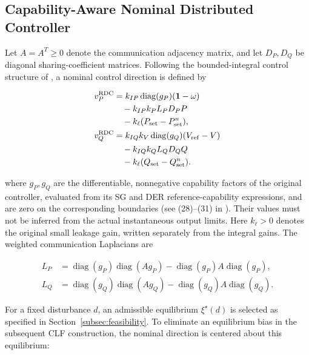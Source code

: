 \documentclass[11pt,twocolumn]{article}
\begin{document}
\subsection{Capability-Aware Nominal Distributed Controller}

\label{subsec:nominal}

Let $A=A^T\geq0$ denote the communication adjacency matrix, and let $D_P,D_Q$ be diagonal sharing-coefficient matrices. Following the bounded-integral control structure of \cite{Kavvathas2025Resilient}, a nominal control direction is defined by

\begin{equation}\label{eq:rdc}
\begin{aligned}
v_P^{\rm RDC}
&=k_{IP}\operatorname{diag}(g_P)(\bm1-\omega)\\
&\quad-k_{IP}k_P L_P D_P P\\
&\quad-k_\ell(P_{\rm set}-P_{\rm set}^n),\\
v_Q^{\rm RDC}
&=k_{IQ}k_V\operatorname{diag}(g_Q)(V_{\rm ref}-V)\\
&\quad-k_{IQ}k_Q L_Q D_Q Q\\
&\quad-k_\ell(Q_{\rm set}-Q_{\rm set}^n).
\end{aligned}
\end{equation}

where $g_P,g_Q$ are the differentiable, nonnegative capability factors of the original controller, evaluated from its SG and DER reference-capability expressions, and are zero on the corresponding boundaries (see (28)--(31) in \cite{Kavvathas2025Resilient}). Their values must not be inferred from the actual instantaneous output limits. Here $k_\ell>0$ denotes the original small leakage gain, written separately from the integral gains. The weighted communication Laplacians are

\begin{equation}\label{eq:laplacians}
\begin{aligned}
L_P&=\operatorname{diag}(g_P)\operatorname{diag}(Ag_P)
-\operatorname{diag}(g_P)A\operatorname{diag}(g_P),\\
L_Q&=\operatorname{diag}(g_Q)\operatorname{diag}(Ag_Q)
-\operatorname{diag}(g_Q)A\operatorname{diag}(g_Q).
\end{aligned}
\end{equation}

For a fixed disturbance $d$, an admissible equilibrium $\xi^\star(d)$ is selected as specified in Section~\ref{subsec:feasibility}. To eliminate an equilibrium bias in the subsequent CLF construction, the nominal direction is centered about this equilibrium:
\end{document}
